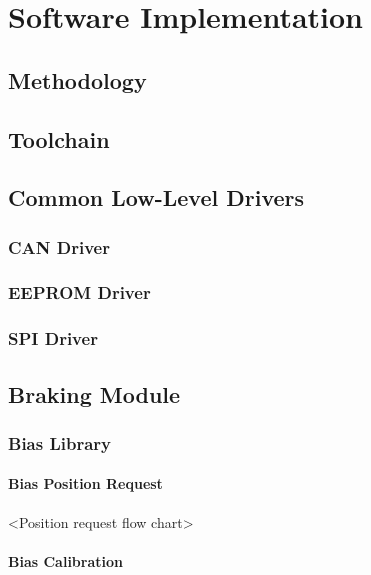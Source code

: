 \section{Software Implementation\label{sec:Software-Implementation}}


\subsection{Methodology}


\subsection{Toolchain}


\subsection{Common Low-Level Drivers}


\subsubsection{CAN Driver}


\subsubsection{EEPROM Driver}


\subsubsection{SPI Driver}





\subsection{Braking Module}


\subsubsection{Bias Library}


\paragraph{Bias Position Request}

<Position request flow chart>


\paragraph{Bias Calibration}

